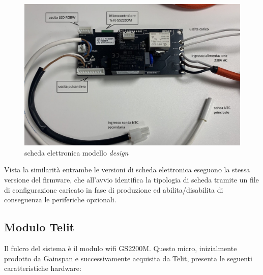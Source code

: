 \documentclass[12pt,a4paper,twoside,titlepage]{book}
\begin{document}
\begin{figure}
    \centering
    \includegraphics[width=\textwidth]{img/scheda-design.jpg}
    \caption{scheda elettronica modello \textit{design}}
    \label{fig:schedadesign}
\end{figure}
    
Vista la similarità entrambe le versioni di scheda elettronica eseguono la stessa versione del \gls{firmware},
che all'avvio identifica la tipologia di scheda tramite un file di configurazione caricato in fase di produzione
ed abilita/disabilita di conseguenza le periferiche opzionali. 

\subsection{Modulo Telit}

Il fulcro del sistema è il modulo \Gls{wifi} GS2200M. Questo \gls{micro}, inizialmente
prodotto da Gainspan e successivamente acquisita da Telit, presenta le seguenti
caratteristiche hardware:
\end{document}
